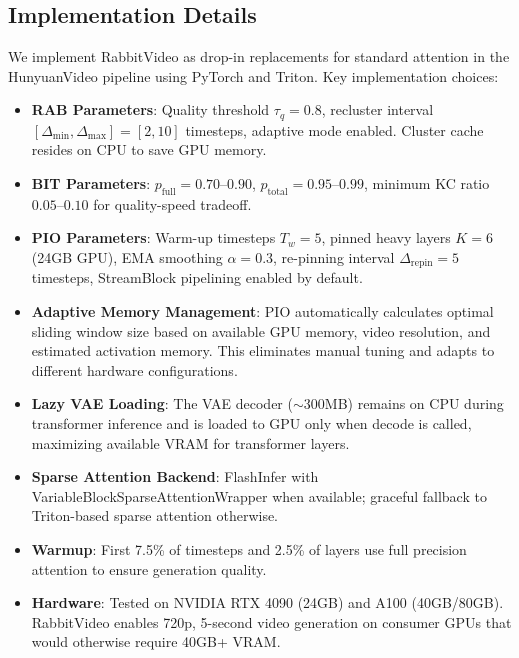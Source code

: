 \subsection{Implementation Details}
\label{sec:implementation}

We implement RabbitVideo as drop-in replacements for standard attention in the HunyuanVideo pipeline using PyTorch and Triton. Key implementation choices:

\begin{itemize}
    \item \textbf{RAB Parameters}: Quality threshold $\tau_q = 0.8$, recluster interval $[\Delta_{\min}, \Delta_{\max}] = [2, 10]$ timesteps, adaptive mode enabled. Cluster cache resides on CPU to save GPU memory.
    \item \textbf{BIT Parameters}: $p_{\text{full}} = 0.70$--$0.90$, $p_{\text{total}} = 0.95$--$0.99$, minimum KC ratio $0.05$--$0.10$ for quality-speed tradeoff.
    \item \textbf{PIO Parameters}: Warm-up timesteps $T_w = 5$, pinned heavy layers $K = 6$ (24GB GPU), EMA smoothing $\alpha = 0.3$, re-pinning interval $\Delta_{\text{repin}} = 5$ timesteps, StreamBlock pipelining enabled by default.
    \item \textbf{Adaptive Memory Management}: PIO automatically calculates optimal sliding window size based on available GPU memory, video resolution, and estimated activation memory. This eliminates manual tuning and adapts to different hardware configurations.
    \item \textbf{Lazy VAE Loading}: The VAE decoder (${\sim}300$MB) remains on CPU during transformer inference and is loaded to GPU only when decode is called, maximizing available VRAM for transformer layers.
    \item \textbf{Sparse Attention Backend}: FlashInfer with VariableBlockSparseAttentionWrapper when available; graceful fallback to Triton-based sparse attention otherwise.
    \item \textbf{Warmup}: First 7.5\% of timesteps and 2.5\% of layers use full precision attention to ensure generation quality.
    \item \textbf{Hardware}: Tested on NVIDIA RTX 4090 (24GB) and A100 (40GB/80GB). RabbitVideo enables 720p, 5-second video generation on consumer GPUs that would otherwise require 40GB+ VRAM.
\end{itemize}
